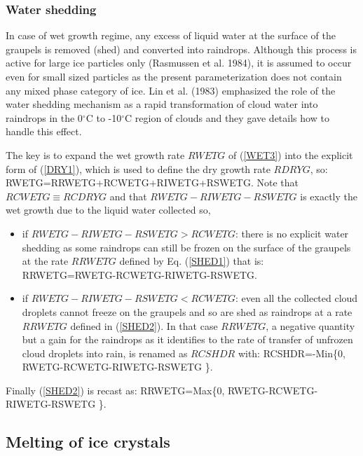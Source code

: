 \subsubsection{Water shedding}
%
In case of wet growth regime, any excess of liquid water at the surface of the
graupels is removed (shed) and converted into raindrops. Although this process
is active for large ice particles only (Rasmussen et al. 1984), it is assumed
to occur even for small sized particles as the present parameterization does
not contain any mixed phase category of ice. Lin et al. (1983) emphasized the
role of the water shedding mechanism as a rapid transformation of cloud water
into raindrops in the 0$^\circ$C to -10$^\circ$C region of clouds and they gave details
how to handle this effect.

The key is to expand the wet growth rate $RWETG$ of (\ref{WET3}) into
the explicit form of (\ref{DRY1}), which is used to define the dry growth rate
$RDRYG$, so:
%
\be\label{SHED1}
RWETG=RRWETG+RCWETG+RIWETG+RSWETG.
\ee
%
\noindent Note that $RCWETG \equiv RCDRYG$ and that $RWETG-RIWETG-RSWETG$ is
exactly the wet growth due to the liquid water collected so,
\begin{itemize}
\item if $RWETG-RIWETG-RSWETG > RCWETG$: there is no explicit water shedding as
some raindrops can still be frozen on the surface of the graupels at the rate
$RRWETG$ defined by Eq. (\ref{SHED1}) that is:
%
\be\label{SHED2}
RRWETG=RWETG-RCWETG-RIWETG-RSWETG.
\ee
%
\item if $RWETG-RIWETG-RSWETG < RCWETG$: even all the collected cloud droplets
cannot freeze on the graupels and so are shed as raindrops at a rate $RRWETG$
defined in (\ref{SHED2}). In that case $RRWETG$, a negative quantity but a
gain for the raindrops as it identifies to the rate of transfer of unfrozen
cloud droplets into rain, is renamed as $RCSHDR$ with:
%
\be\label{SHED3}
RCSHDR=-Min\Big\{0, RWETG-RCWETG-RIWETG-RSWETG \Big\}.
\ee
%
\end{itemize}

Finally (\ref{SHED2}) is recast as:
%
\be\label{SHED4}
RRWETG=Max\Big\{0, RWETG-RCWETG-RIWETG-RSWETG \Big\}.
\ee
%

%
\subsection{Melting of ice crystals}
%
%
